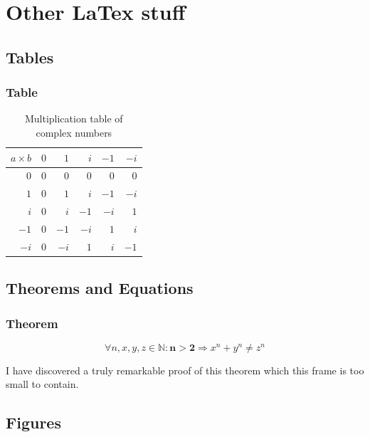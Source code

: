 \documentclass[aspectratio=169]{beamer}
\begin{document}
\section{Other LaTex stuff}

\subsection{Tables}


\begin{frame}
\frametitle{Table}
\begin{table}[H] 
\begin{tabular}{r | r r r r r} 
$a \times b$ & $0$ &  $1$ &  $i$ & $-1$ & $-i$ \\ \hline
         $0$ & $0$ &  $0$ &  $0$ &  $0$ &  $0$ \\
         $1$ & $0$ &  $1$ &  $i$ & $-1$ & $-i$ \\
         $i$ & $0$ &  $i$ &  $-1$ & $-i$ &  $1$ \\
        $-1$ & $0$ & $-1$ &  $-i$ &  $1$ &  $i$ \\
        $-i$ & $0$ & $-i$ &  $1$ &  $i$ & $-1$ \\
\end{tabular}
\caption{Multiplication table of complex numbers}
\end{table}
\end{frame}


\subsection{Theorems and Equations}


\begin{frame}
\frametitle{Theorem}
\begin{theorem}
\begin{equation}
    \forall n, x, y, z \in \mathbb{N}: \mathbf{n > 2} \Rightarrow x^n + y^n \neq z^n
\end{equation}
\end{theorem}
I have discovered a truly remarkable proof of this theorem which this frame is too small to contain.
\end{frame}


\subsection{Figures}
\end{document}
